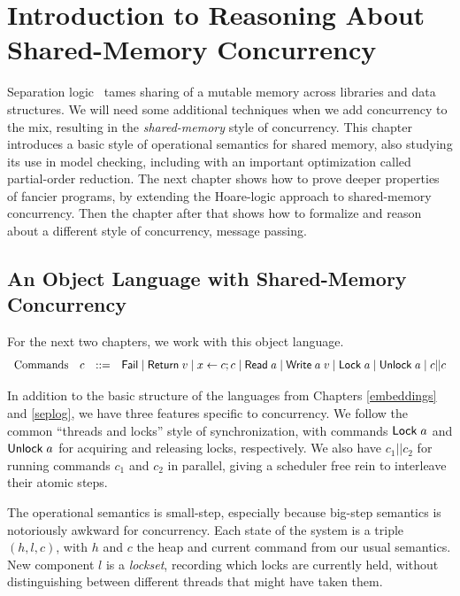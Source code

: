 \documentclass{amsbook}
\theoremstyle{definition}
\theoremstyle{remark}
\numberwithin{section}{chapter}
\numberwithin{equation}{chapter}
\begin{document}

\chapter{Introduction to Reasoning About Shared-Memory Concurrency}\label{sharedmem}

Separation logic~ tames sharing of a mutable memory across libraries and data structures.
We will need some additional techniques when we add concurrency to the mix, resulting in the \emph{shared-memory} style of concurrency.
This chapter introduces a basic style of operational semantics for shared memory, also studying its use in model checking, including with an important optimization called partial-order reduction.
The next chapter shows how to prove deeper properties of fancier programs, by extending the Hoare-logic approach to shared-memory concurrency.
Then the chapter after that shows how to formalize and reason about a different style of concurrency, message passing.

\section{An Object Language with Shared-Memory Concurrency}

For the next two chapters, we work with this object language.
$$\begin{array}{rrcl}
  \textrm{Commands} & c &::=& \mathsf{Fail} \mid \mathsf{Return} \; v \mid x \leftarrow c; c \mid \mathsf{Read} \; a \mid \mathsf{Write} \; a \; v \mid \mathsf{Lock} \; a \mid \mathsf{Unlock} \; a \mid c || c
\end{array}$$

In addition to the basic structure of the languages from Chapters \ref{embeddings} and \ref{seplog}, we have three features specific to concurrency.
We follow the common ``threads and locks'' style of synchronization, with commands $\mathsf{Lock} \; a$ and $\mathsf{Unlock} \; a$ for acquiring and releasing locks, respectively.
We also have $c_1 || c_2$ for running commands $c_1$ and $c_2$ in parallel, giving a scheduler free rein to interleave their atomic steps.

The operational semantics is small-step, especially because big-step semantics is notoriously awkward for concurrency.
Each state of the system is a triple $(h, l, c)$, with $h$ and $c$ the heap and current command from our usual semantics.
New component $l$ is a \emph{lockset}, recording which locks are currently held, without distinguishing between different threads that might have taken them.
\end{document}
